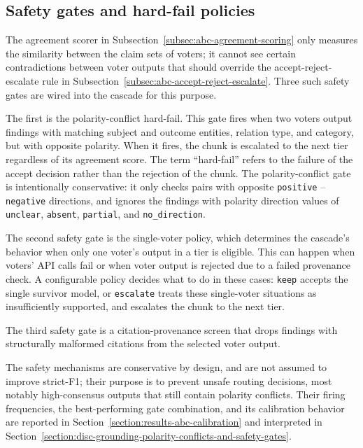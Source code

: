 \subsection{Safety gates and hard-fail policies}\label{subsec:abc-safety-gates}

The agreement scorer in Subsection~\ref{subsec:abc-agreement-scoring} only measures the similarity between the claim sets of voters; it cannot see certain contradictions between voter outputs that should override the accept-reject-escalate rule in Subsection~\ref{subsec:abc-accept-reject-escalate}. Three such safety gates are wired into the cascade for this purpose. 

The first is the polarity-conflict hard-fail. This gate fires when two voters output findings with matching subject and outcome entities, relation type, and category, but with opposite polarity. When it fires, the chunk is escalated to the next tier regardless of its agreement score. The term ``hard-fail'' refers to the failure of the accept decision rather than the rejection of the chunk. The polarity-conflict gate is intentionally conservative: it only checks pairs with opposite \texttt{positive} -- \texttt{negative} directions, and ignores the findings with polarity direction values of \texttt{unclear}, \texttt{absent}, \texttt{partial}, and \texttt{no\_direction}.

The second safety gate is the single-voter policy, which determines the cascade's behavior when only one voter's output in a tier is eligible. This can happen when voters' API calls fail or when voter output is rejected due to a failed provenance check. A configurable policy decides what to do in these cases: \texttt{keep} accepts the single survivor model, or \texttt{escalate} treats these single-voter situations as insufficiently supported, and escalates the chunk to the next tier.

The third safety gate is a citation-provenance screen that drops findings with structurally malformed citations from the selected voter output.

The safety mechanisms are conservative by design, and are not assumed to improve strict-F1; their purpose is to prevent unsafe routing decisions, most notably high-consensus outputs that still contain polarity conflicts. Their firing frequencies, the best-performing gate combination, and its calibration behavior are reported in Section~\ref{section:results-abc-calibration} and interpreted in Section~\ref{section:disc-grounding-polarity-conflicts-and-safety-gates}.